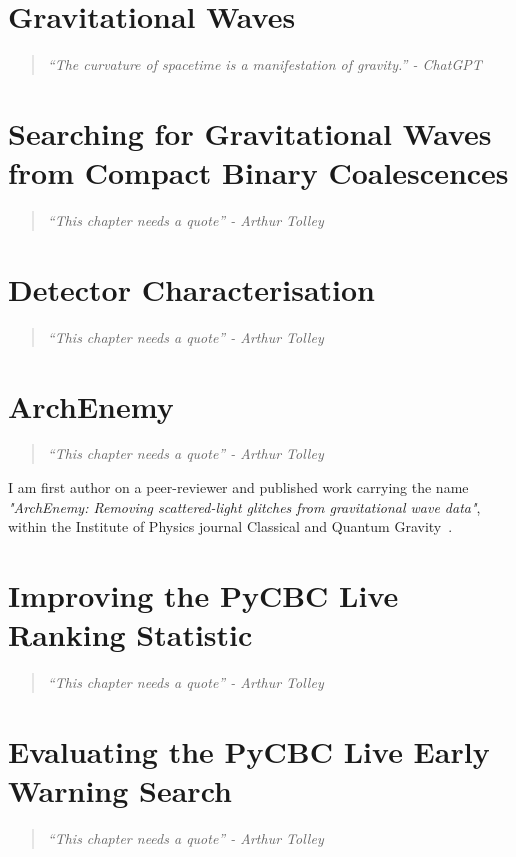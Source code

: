 \documentclass[12pt,twoside]{report} %
\newcommand{\chapterquote}[1]{
  \begin{quote}
    \color{mediumgray}\itshape #1
  \end{quote}
}
\begin{document}
\chapter[Gravitational Waves]{\label{chapter:1-gravitational-waves}Gravitational Waves}
\chapterquote{``The curvature of spacetime is a manifestation of gravity.'' - ChatGPT}


\chapter[Searching for Gravitational Waves from Compact Binary Coalescences]{\label{chapter:2-searches}Searching for Gravitational Waves from Compact Binary Coalescences}
\chapterquote{``This chapter needs a quote'' - Arthur Tolley}


\chapter[Detector Characterisation]{\label{chapter:3-detchar}Detector Characterisation}\chapterquote{``This chapter needs a quote'' - Arthur Tolley}


\chapter[ArchEnemy]{\label{chapter:4-archenemy}ArchEnemy}
\chapterquote{``This chapter needs a quote'' - Arthur Tolley}
I am first author on a peer-reviewer and published work carrying the name \textit{"ArchEnemy: Removing scattered-light glitches from gravitational wave data"}, within the Institute of Physics journal Classical and Quantum Gravity~\cite{ArchEnemy:2023}.
% 

\chapter[Improving the PyCBC Live Ranking Statistic]{\label{chapter:5-pycbc-live}Improving the PyCBC Live Ranking Statistic}
\chapterquote{``This chapter needs a quote'' - Arthur Tolley}
% 

\chapter[Evaluating the PyCBC Live Early Warning Search]{\label{chapter:6-earlywarning}Evaluating the PyCBC Live Early Warning Search}
\chapterquote{``This chapter needs a quote'' - Arthur Tolley}

\end{document}
